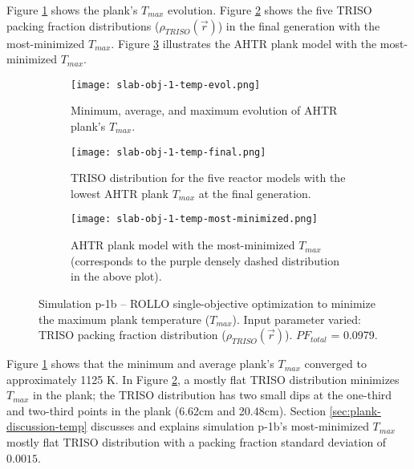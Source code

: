 Figure \ref{fig:slab-obj-1-temp-evol} shows the plank's $T_{max}$ evolution. 
Figure \ref{fig:slab-obj-1-temp-final} shows the five \gls{TRISO} packing fraction
distributions ($\rho_{TRISO}(\vec{r})$) in the final generation with the 
most-minimized $T_{max}$. 
Figure \ref{fig:slab-obj-1-temp-most-minimized} illustrates the \gls{AHTR} plank model 
with the most-minimized $T_{max}$. 
\begin{figure}[htbp!]
    \centering
    \begin{subfigure}{0.9\textwidth}
        \texttt{[image: slab-obj-1-temp-evol.png]}
        \caption{Minimum, average, and maximum evolution of AHTR plank's $T_{max}$.}
        \label{fig:slab-obj-1-temp-evol} 
    \end{subfigure}
    \begin{subfigure}{0.9\textwidth}
        \texttt{[image: slab-obj-1-temp-final.png]}
        \caption{TRISO distribution for the five reactor models with the 
        lowest AHTR plank $T_{max}$ at the final generation.}
        \label{fig:slab-obj-1-temp-final} 
    \end{subfigure}
    \begin{subfigure}{0.9\textwidth}
        \texttt{[image: slab-obj-1-temp-most-minimized.png]}
        \caption{\gls{AHTR} plank model with the most-minimized $T_{max}$
        (corresponds to the purple densely dashed distribution in the above plot).}
        \label{fig:slab-obj-1-temp-most-minimized} 
    \end{subfigure}
    \caption{Simulation p-1b -- ROLLO single-objective optimization to minimize 
    the maximum plank temperature ($T_{max}$). Input parameter varied: TRISO 
    packing fraction distribution ($\rho_{TRISO}(\vec{r})$). $PF_{total}$ = 0.0979.}
    \label{fig:slab-obj-1-temp}
\end{figure}

Figure \ref{fig:slab-obj-1-temp-evol} shows that the minimum and average plank's 
$T_{max}$ converged to approximately 1125 K. 
In Figure \ref{fig:slab-obj-1-temp-final}, a mostly flat TRISO
distribution minimizes $T_{max}$ in the plank; the TRISO distribution 
has two small dips at the one-third and two-third points in the plank 
(6.62cm and 20.48cm). 
Section \ref{sec:plank-discussion-temp} discusses and explains simulation p-1b's 
most-minimized $T_{max}$ mostly flat TRISO distribution with a packing fraction 
standard deviation of $0.0015$. 

